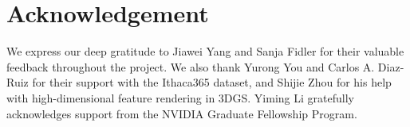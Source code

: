 \vspace{-2mm}
\section*{Acknowledgement}
\vspace{-2mm}
We express our deep gratitude to Jiawei Yang and Sanja Fidler for their valuable feedback throughout the project. We also thank Yurong You and Carlos A. Diaz-Ruiz for their support with the Ithaca365 dataset, and Shijie Zhou for his help with high-dimensional feature rendering in 3DGS. Yiming Li gratefully acknowledges support from the NVIDIA Graduate Fellowship Program.